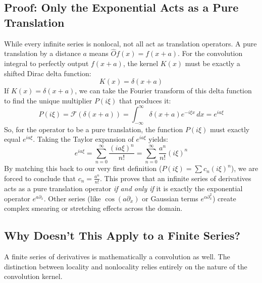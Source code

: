 \documentclass[11pt, a4paper]{article}
\begin{document}
\subsection{Proof: Only the Exponential Acts as a Pure Translation}
While every infinite series is nonlocal, not all act as translation operators. A pure translation by a distance $a$ means $\hat{O} f(x) = f(x+a)$. For the convolution integral to perfectly output $f(x+a)$, the kernel $K(x)$ must be exactly a shifted Dirac delta function:
\[
K(x) = \delta(x+a)
\]
If $K(x) = \delta(x+a)$, we can take the Fourier transform of this delta function to find the unique multiplier $P(i\xi)$ that produces it:
\[
P(i\xi) = \mathcal{F}(\delta(x+a)) = \int_{-\infty}^{\infty} \delta(x+a) e^{-i\xi x} \, dx = e^{i a \xi}
\]
So, for the operator to be a pure translation, the function $P(i\xi)$ must exactly equal $e^{ia\xi}$. Taking the Taylor expansion of $e^{ia\xi}$ yields:
\[
e^{ia\xi} = \sum_{n=0}^{\infty} \frac{(ia\xi)^n}{n!} = \sum_{n=0}^{\infty} \frac{a^n}{n!} (i\xi)^n
\]
By matching this back to our very first definition ($P(i\xi) = \sum c_n (i\xi)^n$), we are forced to conclude that $c_n = \frac{a^n}{n!}$. This proves that an infinite series of derivatives acts as a pure translation operator \emph{if and only if} it is exactly the exponential operator $e^{a\partial_x}$. Other series (like $\cos(a\partial_x)$ or Gaussian terms $e^{\alpha\partial_x^2}$) create complex smearing or stretching effects across the domain.

\subsection{Why Doesn't This Apply to a Finite Series?}
A finite series of derivatives is mathematically a convolution as well. The distinction between locality and nonlocality relies entirely on the nature of the convolution kernel.
\end{document}
